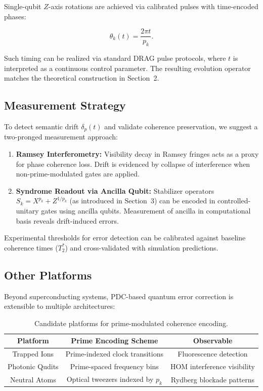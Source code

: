 \documentclass[12]{amsart}
\theoremstyle{plain}
\begin{document}
Single-qubit $Z$-axis rotations are achieved via calibrated pulses with time-encoded phases:

\begin{equation}
\theta_k(t) = \frac{2\pi t}{p_k}.
\end{equation}

Such timing can be realized via standard DRAG pulse protocols, where $t$ is interpreted as a continuous control parameter. The resulting evolution operator matches the theoretical construction in Section~2.

\subsection{Measurement Strategy}

To detect semantic drift $\delta_p(t)$ and validate coherence preservation, we suggest a two-pronged measurement approach:

\begin{enumerate}
    \item \textbf{Ramsey Interferometry:}  
    Visibility decay in Ramsey fringes acts as a proxy for phase coherence loss. Drift is evidenced by collapse of interference when non-prime-modulated gates are applied.

    \item \textbf{Syndrome Readout via Ancilla Qubit:}  
    Stabilizer operators $S_k = X^{p_k} + Z^{1/p_k}$ (as introduced in Section~3) can be encoded in controlled-unitary gates using ancilla qubits. Measurement of ancilla in computational basis reveals drift-induced errors.
\end{enumerate}

Experimental thresholds for error detection can be calibrated against baseline coherence times ($T_2^*$) and cross-validated with simulation predictions.

\subsection{Other Platforms}

Beyond superconducting systems, PDC-based quantum error correction is extensible to multiple architectures:

\begin{table}[]
\centering
\begin{tabular}{|c|c|c|}
\hline
\textbf{Platform} & \textbf{Prime Encoding Scheme} & \textbf{Observable} \\
\hline
Trapped Ions & Prime-indexed clock transitions & Fluorescence detection \\
Photonic Qudits & Prime-spaced frequency bins & HOM interference visibility \\
Neutral Atoms & Optical tweezers indexed by $p_k$ & Rydberg blockade patterns \\
\hline
\end{tabular}
\caption{Candidate platforms for prime-modulated coherence encoding.}
\label{tab:platforms}
\end{table}
\end{document}
